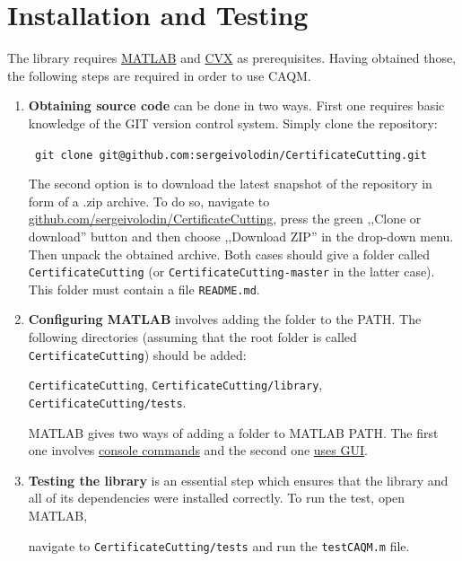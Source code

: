 \documentclass[a4paper]{article}
\theoremstyle{definition}
\begin{document}
\section*{Installation and Testing}
The library requires \href{https://www.mathworks.com/downloads/}{MATLAB} and \href{http://cvxr.com/cvx/download/}{CVX} as prerequisites. Having obtained those, the following steps are required in order to use CAQM.
\begin{enumerate}
\item {\bf Obtaining source code} can be done in two ways. First one requires basic knowledge of the GIT version control system. Simply clone the repository:
\begin{center}\tt
git clone git@github.com:sergeivolodin/CertificateCutting.git
\end{center}
The second option is to download the latest snapshot of the repository in form of a .zip archive. To do so, navigate to \href{https://github.com/sergeivolodin/CertificateCutting}{github.com/sergeivolodin/CertificateCutting}, press the green ,,Clone or download'' button and then choose ,,Download ZIP'' in the drop-down menu. Then unpack the obtained archive. Both cases should give a folder called {\tt CertificateCutting} (or {\tt CertificateCutting-master} in the latter case). This folder must contain a file {\tt README.md}.
\item {\bf Configuring MATLAB} involves adding the folder to the PATH. The following directories (assuming that the root folder is called {\tt CertificateCutting}) should be added: 

\begin{center}
{\tt CertificateCutting}, {\tt CertificateCutting/library}, {\tt CertificateCutting/tests}.
\end{center}

MATLAB gives two ways of adding a folder to MATLAB PATH. The first one involves \href{https://www.mathworks.com/help/matlab/ref/addpath.html}{console commands} and the second one \href{http://www.mathworks.com/help/matlab/ref/pathtool.html}{uses GUI}.
\item {\bf Testing the library} is an essential step which ensures that the library and all of its dependencies were installed correctly. To run the test, open MATLAB,

\begin{center}
navigate to {\tt CertificateCutting/tests} and run the {\tt testCAQM.m} file.
\end{center}


\end{enumerate}
\end{document}
